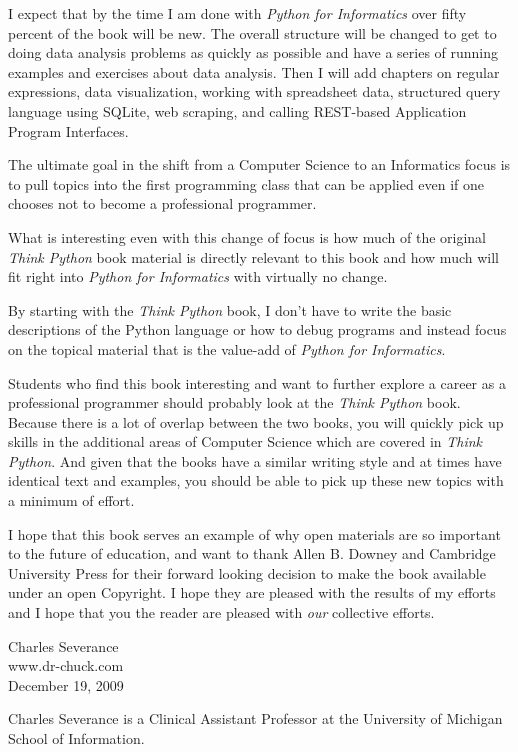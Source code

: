 \documentclass[10pt]{book}
\begin{document}
I expect that by the time I am done with {\em Python for Informatics} 
over fifty percent of the book will be new.  The overall structure
will be changed to get to doing data analysis problems as quickly as
possible and have a series of running examples and exercises 
about data analysis.
Then I will add chapters on regular expressions, data
visualization, working with spreadsheet data, structured 
query language using SQLite, web scraping, and calling REST-based
Application Program Interfaces.  

The ultimate goal in the shift from a Computer Science to an Informatics
focus is to pull topics into the first programming class that can 
be applied even if one chooses not to become a professional programmer.

What is interesting even with this change of focus 
is how much of the original {\em Think Python} book
material is directly relevant to this book and how much will fit
right into {\em Python for Informatics} with virtually no change.

By starting with the {\em Think Python} book, I don't have to write the
basic descriptions of the Python language or how to debug programs
and instead focus on the topical material that is the value-add
of {\em Python for Informatics}.

Students who find this book interesting and want to further explore
a career as a professional programmer should probably look at 
the {\em Think Python} book.  Because there
is a lot of overlap between the two books, 
you will quickly pick up skills in the additional
areas of Computer Science which are covered in {\em Think Python}.
And given that the books have a similar writing style and at times
have identical text and examples, you should be 
able to pick up these new topics with a minimum of effort.

I hope that this book serves an example of why open 
materials are so important to the future of education,
and want to thank Allen B. Downey and Cambridge University
Press for their forward looking decision to make the book available
under an open Copyright.   I hope they are pleased with the 
results of my efforts and I hope that you the reader are pleased with
{\em our} collective efforts.

Charles Severance\\
www.dr-chuck.com\\
December 19, 2009

Charles Severance is a 
Clinical Assistant Professor 
at the University of Michigan School of Information.
\end{document}
